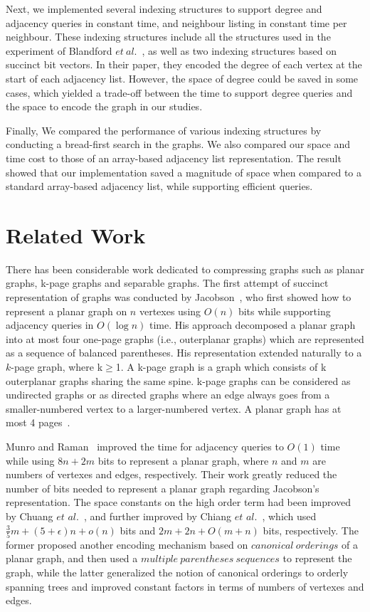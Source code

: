 \documentclass[12pt,glossary]{dalthesis}
\begin{document}
\bigskip
\bigskip

Next, we implemented several indexing structures to support degree and adjacency queries in constant time, and neighbour listing in constant time per neighbour. These indexing structures include all the structures used in the experiment of Blandford $et \ al.$~\cite{compact-representation}, as well as two indexing structures based on succinct bit vectors. In their paper, they encoded the degree of each vertex at the start of each adjacency list. However, the space of degree could be saved in some cases, which yielded a trade-off between the time to support degree queries and the space to encode the graph in our studies.

\bigskip
\bigskip

Finally, We compared the performance of various indexing structures by conducting a bread-first search in the graphs. We also compared our space and time cost to those of an array-based adjacency list representation. The result showed that our implementation saved a magnitude of space when compared to a standard array-based adjacency list, while supporting efficient queries.   

\section{Related Work}

There has been considerable work dedicated to compressing graphs such as planar graphs, k-page graphs and separable graphs. The first attempt of succinct representation of graphs was conducted by Jacobson~\cite{Jacobson}, who first showed how to represent a planar graph on $n$ vertexes using $O(n)$ bits while supporting adjacency queries in $O(\log n)$ time. His approach decomposed a planar graph into at most four one-page graphs (i.e., outerplanar graphs) which are represented as a sequence of balanced parentheses. His representation extended naturally to a $k$-page graph, where k$\geq$1. A k-page graph is a graph which consists of k outerplanar graphs sharing the same spine. k-page graphs can be considered as undirected graphs or as directed graphs where an edge always goes from a smaller-numbered vertex to a larger-numbered vertex. A planar graph has at most 4 pages~\cite{k-page-def}. 

\bigskip
\bigskip

Munro and Raman~\cite{Munro} improved the time for adjacency queries to $O(1)$ time while using $8n+2m$ bits to represent a planar graph, where $n$ and $m$ are numbers of vertexes and edges, respectively. Their work greatly reduced the number of bits needed to represent a planar graph regarding Jacobson's representation. The space constants on the high order term had been improved by Chuang $et$ $al.$~\cite{Chuang}, and further improved by Chiang $et$ $al.$~\cite{Chiang}, which used $\frac{3}{5} m + (5+ \epsilon )n + o(n)$ bits and  $2m+2n+O(m+n)$ bits, respectively. The former proposed another encoding mechanism based on $canonical \ orderings$ of a planar graph, and then used a $multiple \ parentheses \ sequences$ to represent the graph, while the latter generalized the notion of canonical orderings to orderly spanning trees and improved constant factors in terms of numbers of vertexes and edges. 
\end{document}
